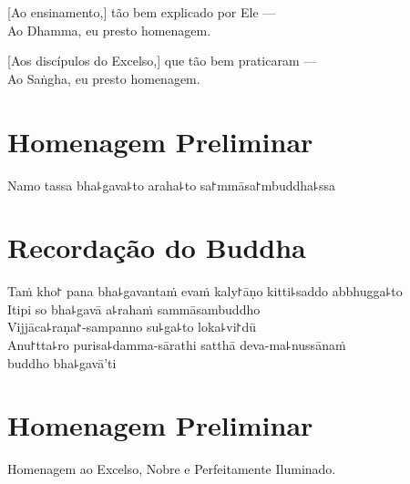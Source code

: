 [Ao ensinamento,] tão bem explicado por Ele ---\\
 Ao Dhamma, eu presto homenagem. 

[Aos discípulos do Excelso,] que tão bem praticaram ---\\
Ao Saṅgha, eu presto homenagem. 

\clearpage

\chapter*{Homenagem Preliminar}

\begin{leader}
\end{leader}

Namo tassa bha꜕gava꜕to araha꜕to sa꜓mmāsa꜓mbuddha꜕ssa


\chapter*{Recordação do Buddha}

\delegateSetUseNext

\begin{leader}
\end{leader}

Taṁ kho꜓ pana bha꜕gavantaṁ evaṁ kaly꜓āṇo kitti꜕saddo abbhugga꜕to\\
Itipi so bha꜕gavā a꜕rahaṁ sammāsambuddho\\
Vijjāca꜕raṇa꜓-sampanno su꜕ga꜕to loka꜕vi꜓dū\\
Anu꜓tta꜕ro purisa꜕damma-sārathi satthā deva-ma꜕nussānaṁ\\
\vin buddho bha꜕gavā'ti

\clearpage

\chapter{Homenagem Preliminar}

\begin{leader}
\end{leader}

Homenagem ao Excelso, Nobre e Perfeitamente Iluminado.



